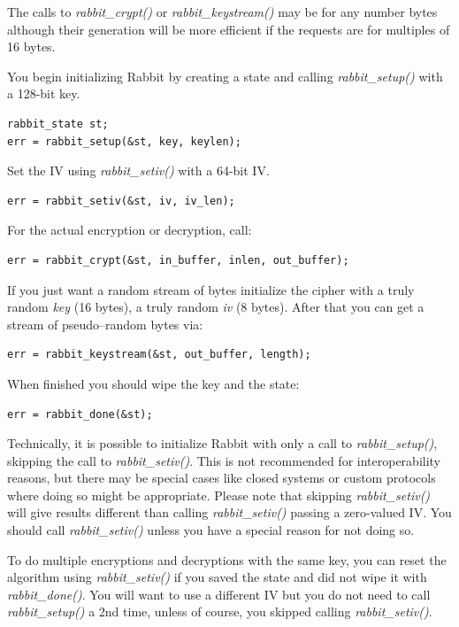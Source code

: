 \documentclass[synpaper]{book}
\begin{document}
The calls to \textit{rabbit\_crypt()} or \textit{rabbit\_keystream()} may be for any
number bytes although their generation will be more efficient if the requests are for
multiples of 16 bytes.

You begin initializing Rabbit by creating a state and calling \textit{rabbit\_setup()}
with a 128-bit key.
\begin{verbatim}
rabbit_state st;
err = rabbit_setup(&st, key, keylen);
\end{verbatim}

Set the IV using \textit{rabbit\_setiv()} with a 64-bit IV.
\begin{verbatim}
err = rabbit_setiv(&st, iv, iv_len);
\end{verbatim}

For the actual encryption or decryption, call:
\begin{verbatim}
err = rabbit_crypt(&st, in_buffer, inlen, out_buffer);
\end{verbatim}

If you just want a random stream of bytes initialize the cipher with a truly random \textit{key}
(16 bytes), a truly random \textit{iv} (8 bytes). After that you can
get a stream of pseudo--random bytes via:
\begin{verbatim}
err = rabbit_keystream(&st, out_buffer, length);
\end{verbatim}

When finished you should wipe the key and the state:
\begin{verbatim}
err = rabbit_done(&st);
\end{verbatim}

Technically, it is possible to initialize Rabbit with only a call to \textit{rabbit\_setup()},
skipping the call to \textit{rabbit\_setiv()}.  This is not recommended for interoperability reasons,
but there may be special cases like closed systems or custom protocols where doing so might be
appropriate.  Please note that skipping \textit{rabbit\_setiv()} will give results different than
calling \textit{rabbit\_setiv()} passing a zero-valued IV.  You should call \textit{rabbit\_setiv()} unless
you have a special reason for not doing so.

To do multiple encryptions and decryptions with the same key, you can reset the algorithm
using \textit{rabbit\_setiv()} if you saved the state and did not wipe it with \textit{rabbit\_done()}.
You will want to use a different IV but you do not need to call \textit{rabbit\_setup()} a 2nd time,
unless of course, you skipped calling \textit{rabbit\_setiv()}.
\end{document}
